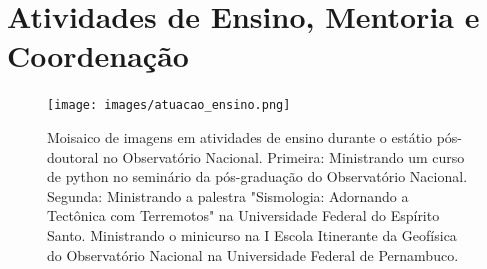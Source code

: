 \documentclass[10pt,a4paper,oneside]{book}
\newcommand{\HeroFigPad}{\vspace{-1cm}}
\begin{document}
%
%


\chapter{Atividades de Ensino, Mentoria e Coordenação}
\label{cap_ensino}

\begin{figure}[h]
  \HeroFigPad
  \begin{center}
    \texttt{[image: images/atuacao\_ensino.png]}
  \end{center}
  \caption{
    Moisaico de imagens em atividades de ensino durante o estátio pós-doutoral no Observatório Nacional. Primeira: Ministrando um curso de python no seminário da pós-graduação do Observatório Nacional. Segunda: Ministrando a palestra "Sismologia: Adornando a Tectônica com Terremotos" na Universidade Federal do Espírito Santo. Ministrando o minicurso na I Escola Itinerante da Geofísica do Observatório Nacional na Universidade Federal de Pernambuco.}
\end{figure}
\end{document}
